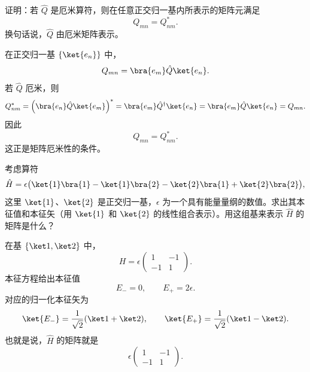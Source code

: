 \begin{question}
证明：若 $\hat Q$ 是厄米算符，则在任意正交归一基内所表示的矩阵元满足
\[
Q_{mn}=Q_{nm}^*.
\]
换句话说，$\hat Q$ 由厄米矩阵表示。
\end{question}
\begin{solution}
在正交归一基 $\{\ket{e_n}\}$ 中，
\[
Q_{mn}=\bra{e_m}\hat Q\ket{e_n}.
\]
若 $\hat Q$ 厄米，则
\[
Q_{nm}^*=\left(\bra{e_n}\hat Q\ket{e_m}\right)^*
=\bra{e_m}\hat Q^\dagger\ket{e_n}
=\bra{e_m}\hat Q\ket{e_n}=Q_{mn}.
\]
因此
\[
\boxed{Q_{mn}=Q_{nm}^*.}
\]
这正是矩阵厄米性的条件。
\end{solution}

\begin{question}
考虑算符
\[
\hat H=\epsilon\bigl(\ket{1}\bra{1}-\ket{1}\bra{2}-\ket{2}\bra{1}+\ket{2}\bra{2}\bigr),
\]
这里 $\ket{1}$、$\ket{2}$ 是正交归一基，$\epsilon$ 为一个具有能量量纲的数值。求出其本征值和本征矢（用 $\ket{1}$ 和 $\ket{2}$ 的线性组合表示）。用这组基来表示 $\hat H$ 的矩阵是什么？
\end{question}
\begin{solution}
在基 $\{\ket1,\ket2\}$ 中，
\[
H=\epsilon\begin{pmatrix}1&-1\\-1&1\end{pmatrix}.
\]
本征方程给出本征值
\[
E_-=0,
\qquad
E_+=2\epsilon.
\]
对应的归一化本征矢为
\[
\ket{E_-}=\frac1{\sqrt2}(\ket1+\ket2),
\qquad
\ket{E_+}=\frac1{\sqrt2}(\ket1-\ket2).
\]
也就是说，$\hat H$ 的矩阵就是
\[
\boxed{\epsilon\begin{pmatrix}1&-1\\-1&1\end{pmatrix}.}
\]
\end{solution}


